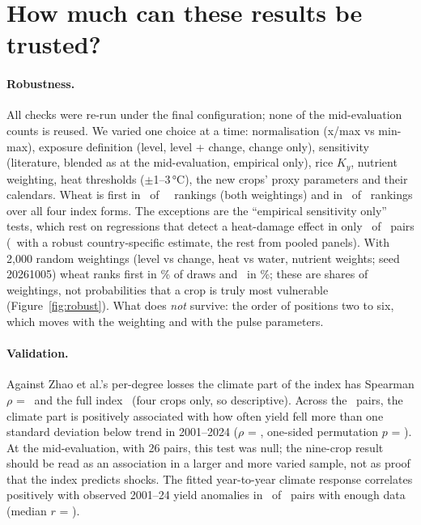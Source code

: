 \section{How much can these results be trusted?}\label{sec:checks}

\paragraph{Robustness.} All checks were re-run under the final configuration; none of the mid-evaluation
counts is reused. We varied one choice at a time: normalisation (x/max vs min-max), exposure definition
(level, level + change, change only), sensitivity (literature, blended as at the mid-evaluation, empirical
only), rice $K_y$, nutrient weighting, heat thresholds ($\pm$1--3\,\si{\celsius}), the new crops' proxy
parameters and their calendars. Wheat is first in \robTopFfour\ of \robNFfour\ \Fd\ rankings (both
weightings) and in \robTopAll\ of \robN\ rankings over all four index forms. The exceptions are the
``empirical sensitivity only'' tests, which rest on regressions that detect a heat-damage effect in only \empHeatDetected\ of \empN\ pairs (\empHeatCountry\ with a robust country-specific estimate, the rest from pooled panels). With 2,000 random weightings (level vs change, heat vs water, nutrient weights; seed 20261005) wheat
ranks first in \mcTopShare\% of draws and \mcSecond\ in \mcSecondShare\%; these are shares of weightings,
not probabilities that a crop is truly most vulnerable (Figure~\ref{fig:robust}). What does \emph{not}
survive: the order of positions two to six, which moves with the weighting and with the pulse parameters.

\paragraph{Validation.} Against Zhao et al.'s per-degree losses \citep{zhao2017} the climate part of the
index has Spearman $\rho$ = \zhaoRhoClimate\ and the full index \zhaoRhoFfour\ (four crops only, so
descriptive). Across the \shockNpairs\ pairs, the climate part is positively associated with how often yield
fell more than one standard deviation below trend in 2001--2024 ($\rho$ = \shockRho, one-sided permutation
$p$ = \shockP). At the mid-evaluation, with 26 pairs, this test was null; the nine-crop result should be read
as an association in a larger and more varied sample, not as proof that the index predicts shocks. The
fitted year-to-year climate response correlates positively with observed 2001--24 yield anomalies in
\oosPos\ of \oosN\ pairs with enough data (median $r$ = \oosMedian).

